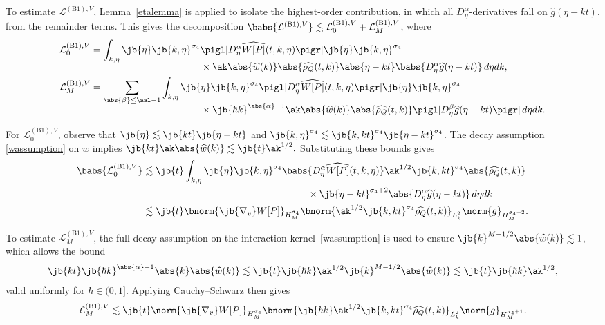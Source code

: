 To estimate \(\mathcal{L}^{\mathrm{(B1)},V}\), Lemma~\ref{etalemma} is applied to isolate the highest-order contribution, in which all \( D_\eta^\alpha \)-derivatives fall on \(\widehat{g}(\eta - kt)\), from the remainder terms. This gives the decomposition $\babs{\mathcal{L}^{\mathrm{(B1)},V}}\lesssim \mathcal{L}_0^{\mathrm{(B1)},V} + \mathcal{L}_M^{\mathrm{(B1)},V}$, where
\begin{align*}
\mathcal{L}_0^{\mathrm{(B1)},V}&=\int_{k,\eta}\jb{\eta}\jb{k,\eta}^{\sigma_4} \pigl|D_\eta^\alpha \widehat{W[P]}(t,k,\eta)\pigr|\jb{\eta}\jb{k,\eta}^{\sigma_4} \\[-5pt]
&\hspace{4cm}\times\ak\abs{\widehat w(k)}\abs{\widehat{\rho_Q}(t,k)}\abs{\eta-kt}\babs{D^\alpha_\eta\widehat g(\eta-kt)}\,d\eta dk,\\
\mathcal{L}_M^{\mathrm{(B1)},V}&=\sum_{\abs{\beta}\leq \aal-1}\int_{k,\eta}\jb{\eta}\jb{k,\eta}^{\sigma_4} \pigl|D_\eta^\alpha \widehat{W[P]}(t,k,\eta)\pigr|\jb{\eta}\jb{k,\eta}^{\sigma_4}\\[-6pt]
&\hspace{4cm}\times\jb{\hbar k}^{\abs{\alpha}-1}\ak\abs{\widehat w(k)}\abs{\widehat{\rho_Q}(t,k)}\pigl|{D^\beta_\eta\widehat g(\eta-kt)}\pigr|\,d\eta dk.
\end{align*}

For \(\mathcal{L}_0^{\mathrm{(B1)},V}\), observe that \(\jb{\eta} \lesssim \jb{kt} \jb{\eta - kt}\) and \(\jb{k,\eta}^{\sigma_4} \lesssim \jb{k,kt}^{\sigma_4} \jb{\eta - kt}^{\sigma_4}\). The decay assumption \eqref{wassumption} on \(w\) implies $\jb{kt} \ak \abs{\widehat{w}(k)} \lesssim \jb{t} \ak^{1/2}.$ Substituting these bounds gives
\begin{align*}
\babs{\mathcal{L}_0^{\mathrm{(B1)},V}}&\lesssim\jb{t}\int_{k,\eta}\jb{\eta}\jb{k,\eta}^{\sigma_4} \babs{D_\eta^\alpha \widehat{W[P]}(t,k,\eta)}\ak^{1/2}\jb{k,kt}^{\sigma_4}\abs{\widehat{\rho_Q}(t,k)}\\
&\hspace{6cm}\times\jb{\eta-kt}^{\sigma_4+2}\abs{D^\alpha_\eta\widehat g(\eta-kt)}\,d\eta dk\\
&\lesssim\jb{t}\bnorm{\jb{\nabla_v}W[P]}_{H^{\sigma_4}_M}\bnorm{\ak^{1/2}\jb{k,kt}^{\sigma_4}\widehat{\rho_Q}(t,k)}_{L^2_{k}}\norm{g}_{H^{\sigma_4+2}_M}.
\end{align*}

To estimate \(\mathcal{L}_M^{\mathrm{(B1)},V}\), the full decay assumption on the interaction kernel~\eqref{wassumption} is used to ensure \(\jb{k}^{M - 1/2} \abs{\widehat{w}(k)} \lesssim 1\), which allows the bound
\[
\jb{kt} \jb{\hbar k}^{\abs{\alpha} - 1} \abs{k}\abs{\widehat w(k)} \lesssim \jb{t} \jb{\hbar k} \ak^{1/2} \jb{k}^{M - 1/2}\abs{\widehat w(k)} \lesssim\jb{t} \jb{\hbar k} \ak^{1/2},
\]
valid uniformly for \(\hbar \in (0,1]\). Applying Cauchy--Schwarz then gives
\begin{align*}
\mathcal{L}_M^{\mathrm{(B1)},V}\lesssim\jb{t}\norm{\jb{\nabla_v}W[P]}_{H^{\sigma_4}_M}\bnorm{\jb{\hbar k}\ak^{1/2}\jb{k,kt}^{\sigma_4}\widehat{\rho_Q}(t,k)}_{L^2_{k}}\norm{g}_{H^{\sigma_4+1}_M}.
\end{align*}

